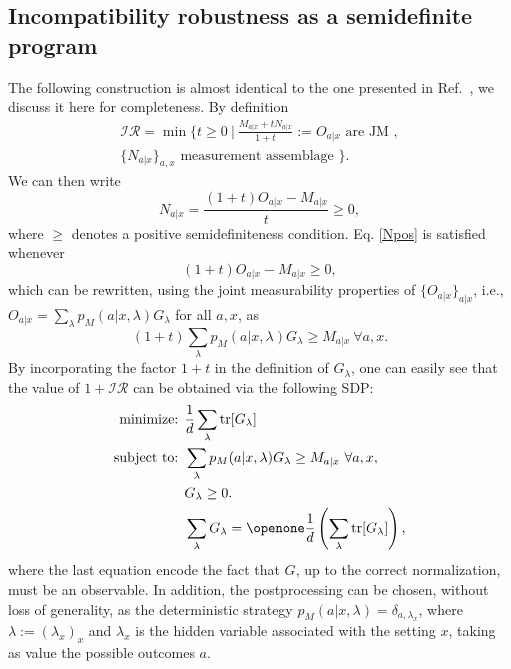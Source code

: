 \documentclass[10pt,twocolumn,aps,prl,nobibnotes,showpacs,superscriptaddress,floatfix]{revtex4-1}
\DeclareMathOperator{\tr}{tr}
\theoremstyle{definition}
\begin{document}
\subsection{Incompatibility robustness as a semidefinite program}
The following construction is almost identical to the one presented in Ref.~\cite{Piani15}, we discuss it here for completeness. By definition
\begin{equation}
\begin{split}
 \mathcal{IR} = \min \Big\lbrace t \geq 0\  \Big|\ \frac{M_{a|x} + t N_{a|x}}{1+t}:=O_{a|x} \text{ are JM },\\
 \{ N_{a|x} \}_{a,x} \text{ measurement assemblage }  \Big\rbrace.
\end{split}
\end{equation}
We can then write 
\begin{equation}\label{Npos}
N_{a|x} = \frac{(1+t) O_{a|x} - M_{a|x}}{t} \geq 0, 
\end{equation}
where $\geq$ denotes a positive semidefiniteness condition. Eq. \eqref{Npos} is satisfied whenever
\begin{equation}
(1+t) O_{a|x} - M_{a|x} \geq 0,
\end{equation}
which can be rewritten, using the joint measurability properties of $\{O_{a|x}\}_{a|x}$, i.e.,  $O_{a|x} = \sum_\lambda p_M(a|x,\lambda) G_\lambda$ for all $a,x$, as
\begin{equation}
(1+t)\sum_\lambda p_M(a|x,\lambda) G_\lambda\geq M_{a|x} \ \forall a,x.
\end{equation}
By incorporating the factor $1+t$ in the definition of $G_\lambda$, one can easily see that the value of $1+\mathcal{IR}$ can be obtained via the following SDP:
\begin{equation}\begin{split}\label{e:SDP}
\text{minimize: } &\frac{1}{d}\sum_\lambda \tr[G_\lambda] \\
\text{subject to: }&
\sum_\lambda p_M(a|x,\lambda) G_\lambda\geq M_{a|x} \ \forall a,x, \\
 & G_\lambda\geq 0 .\\
 & \sum_\lambda G_\lambda = \openone \frac{1}{d}\left(\sum_\lambda \tr[G_\lambda]\right), 
\end{split}
\end{equation}
where the last equation encode the fact that $G$, up to the correct normalization, must be an observable. In addition, the postprocessing can be chosen, without loss of generality, as the deterministic strategy 
$p_M(a|x,\lambda) = \delta_{a,\lambda_x}$, where $\lambda:=(\lambda_x)_x$ and $\lambda_x$ is the hidden variable associated with the setting $x$, taking as value the possible outcomes $a$.
\end{document}
